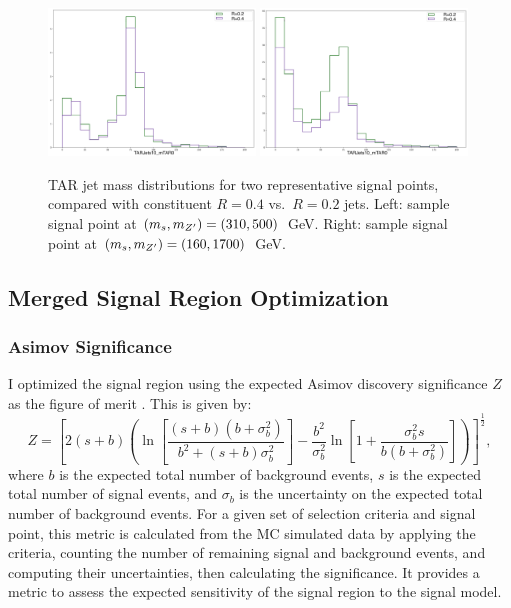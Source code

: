 \begin{figure}[h]
  \centering
     \includegraphics[width = 0.49\textwidth]{Figures/4/TAR/04_monoSww_semilep_zp500_dm200_dh310.png}
     \includegraphics[width = 0.49\textwidth]{Figures/4/TAR/04_monoSww_semilep_zp1700_dm200_dh160.png}

     \caption{TAR jet mass distributions for two representative signal points, compared with constituent \akt $R=0.4$ vs.~\akt $R=0.2$ jets. Left: sample signal point at $(m_s, m_{Z^\prime})=(310, 500)$~GeV. Right: sample signal point at $(m_s, m_{Z^\prime})=(160, 1700)$~GeV.}
     \label{fig:R04_TAR_plots}
\end{figure}
\FloatBarrier
\subsection{Merged Signal Region Optimization}
\subsubsection{Asimov Significance}
I optimized the \merged signal region using the expected Asimov discovery significance $Z$ as the figure of merit  \cite{Asimov}. This is given by:
\begin{equation}
  Z = \left[ 2(s+b)\left(
    \ln\left[ \frac{(s+b)(b+\sigma_b^2)}{b^2 + (s+b)\sigma_b^2} \right]
    - \frac{b^2}{\sigma_b^2}\ln\left[ 1 + \frac{\sigma_b^2 s}{b(b+\sigma_b^2)} \right]
  \right) \right]^\frac{1}{2},
  \label{eq:asimov}
\end{equation}
where $b$ is the expected total number of background events, $s$ is the expected total number of signal events, and $\sigma_b$ is the uncertainty on the expected total number of background events. For a given set of selection criteria and signal point, this metric is calculated from the MC simulated data by applying the criteria, counting the number of remaining signal and background events, and computing their uncertainties, then calculating the significance. It provides a metric to assess the expected sensitivity of the signal region to the signal model.

